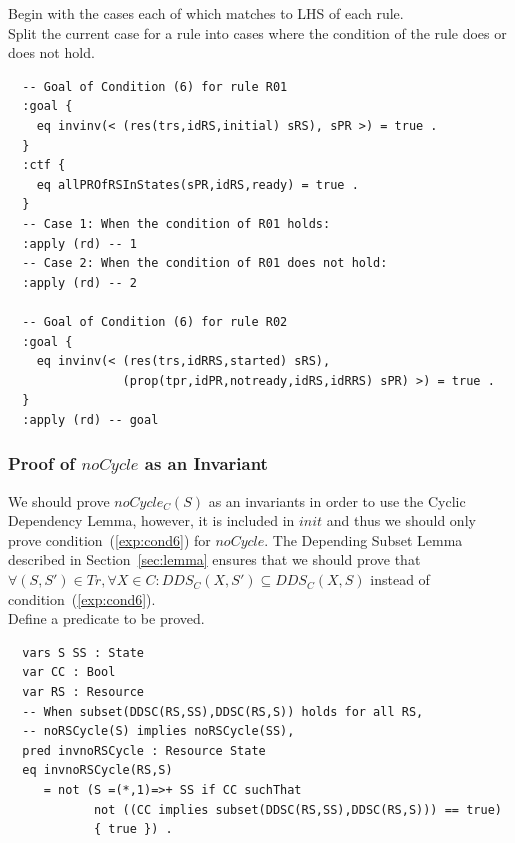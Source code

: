 \documentclass[12pt]{report}
\begin{document}
\vspace{0.3cm}
 Begin with the cases each of which matches to
LHS of each rule. \\ 
 Split the current case for a rule into
cases where the condition of the rule does or does not hold. 
\small
\begin{verbatim}
  -- Goal of Condition (6) for rule R01
  :goal {
    eq invinv(< (res(trs,idRS,initial) sRS), sPR >) = true .
  }
  :ctf {
    eq allPROfRSInStates(sPR,idRS,ready) = true .
  }
  -- Case 1: When the condition of R01 holds:
  :apply (rd) -- 1
  -- Case 2: When the condition of R01 does not hold:
  :apply (rd) -- 2

  -- Goal of Condition (6) for rule R02
  :goal {
    eq invinv(< (res(trs,idRRS,started) sRS),
                (prop(tpr,idPR,notready,idRS,idRRS) sPR) >) = true .
  }
  :apply (rd) -- goal
\end{verbatim}
\normalsize

\subsubsection*{Proof of $noCycle$ as an Invariant}
We should prove $noCycle_C(S)$ as an invariants in order to use the
Cyclic Dependency Lemma, however, it is included in $init$ and thus we
should only prove condition~(\ref{exp:cond6}) for $noCycle$.  The
Depending Subset Lemma described in Section~\ref{sec:lemma} ensures
that we should prove that $\forall (S,S') \in Tr, \forall X\in
C:DDS_C(X,S')\subseteq DDS_C(X,S)$ instead of
condition~(\ref{exp:cond6}).\\

 Define a predicate to be proved. 
\small
\begin{verbatim}
  vars S SS : State
  var CC : Bool
  var RS : Resource
  -- When subset(DDSC(RS,SS),DDSC(RS,S)) holds for all RS,
  -- noRSCycle(S) implies noRSCycle(SS),
  pred invnoRSCycle : Resource State
  eq invnoRSCycle(RS,S) 
     = not (S =(*,1)=>+ SS if CC suchThat
            not ((CC implies subset(DDSC(RS,SS),DDSC(RS,S))) == true)
            { true }) .
\end{verbatim}
\normalsize
\end{document}
